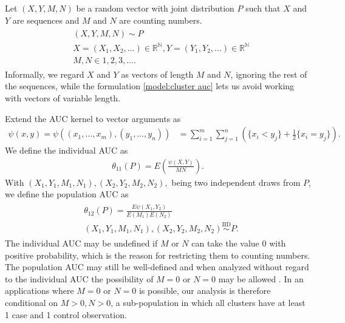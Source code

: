 \documentclass[12pt]{article}
\DeclareMathOperator{\AUC}{AUC}
\newcommand{\E}{E}
\renewcommand{\P}{P}
\newcommand{\cind}{\perp \!\!\! \perp}
\newcommand{\aucindiv}{\theta_{11}}%
\newcommand{\aucpop}{\theta_{12}}%
\newcommand{\kernel}{\psi}
\begin{document}
Let $(X,Y,M,N)$ be a random vector
with joint distribution $\P$  such that $X$ and $Y$ are sequences and $M$ and $N$ are counting numbers.%
\begin{gather}
\begin{aligned}\label{model:cluster auc}
  &(X,Y,M,N) \sim \P\\
  &X=(X_1,X_2,\ldots)\in\mathbb{R}^\mathbb{N}, Y=(Y_1,Y_2,\ldots)\in\mathbb{R}^\mathbb{N}\\
  &M,N \in 1,2,3,\ldots .
\end{aligned}
\end{gather}
Informally, we regard $X$ and $Y$ as vectors of length $M$ and $N$, ignoring the rest of the sequences, while the formulation \eqref{model:cluster auc} lets us avoid working with vectors of variable length.

Extend the AUC kernel to vector arguments as
\begin{align}
  \kernel(x,y)=\kernel((x_1,\ldots,x_m),(y_1,\ldots,y_n))&=\sum_{i=1}^m\sum_{j=1}^n\left(\{x_i<y_j\}+\frac{1}{2}\{x_i=y_j\}\right).\label{defn:auc kernel}
\end{align}
We define the individual AUC as
\begin{align}
  \aucindiv(\P)=\E\left(\frac{\psi(X,Y)}{MN} \right).
  \label{defn:aucindiv}
\end{align}
With $(X_1,Y_1,M_1,N_1),(X_2,Y_2,M_2,N_2),$ being two independent draws from $P$, we define the population AUC as
\begin{gather}
  \begin{aligned}
  &\aucpop(\P)=\frac{\E\psi(X_1,Y_2)}{\E(M_1)\E(N_2)}\label{defn:aucpop}\\
  &(X_1,Y_1,M_1,N_1),(X_2,Y_2,M_2,N_2) \overset{\text{IID}}{\sim} \P.
\end{aligned}
\end{gather}
The individual AUC may be undefined if $M$ or $N$ can take the value
$0$ with positive probability, which is the reason for restricting
them to counting numbers. The population AUC may still be well-defined
and when analyzed without regard to the individual AUC the possibility
of $M=0$ or $N=0$ may be allowed \citep{obuchowski1997}. In an
applications where $M=0$ or $N=0$ is possible, our analysis is
therefore conditional on $M>0,N>0$, a sub-population in which all
clusters have at least 1 case and 1 control observation.
\end{document}
